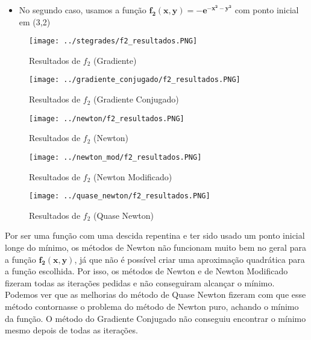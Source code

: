\begin{itemize}
	\item No segundo caso, usamos a função $ \mathbf{f_2(x,y) = -e^{-x^2 -y^2}} $ com ponto inicial em (3,2)
\end{itemize}

\begin{figure}[H]
	\centering
	\begin{minipage}{.5\textwidth}
		\centering
		\texttt{[image: ../stegrades/f2\_resultados.PNG]}
		\caption{Resultados de $ f_2 $ (Gradiente)}
		\label{fig:resultados_grad_f2}
	\end{minipage}%
	\begin{minipage}{.5\textwidth}
		\centering
		\texttt{[image: ../gradiente\_conjugado/f2\_resultados.PNG]}
		\caption{Resultados de $ f_2 $ (Gradiente Conjugado)}
		\label{fig:resultados_grad_conj_f2}
	\end{minipage}
\end{figure}

\begin{figure}[H]
	\centering
	\begin{minipage}{.5\textwidth}
		\centering
		\texttt{[image: ../newton/f2\_resultados.PNG]}
		\caption{Resultados de $ f_2 $ (Newton)}
		\label{fig:resultados_newton_f2}
	\end{minipage}%
	\begin{minipage}{.5\textwidth}
		\centering
		\texttt{[image: ../newton\_mod/f2\_resultados.PNG]}
		\caption{Resultados de $ f_2 $ (Newton Modificado)}
		\label{fig:resultados_newton_mod_f2}
	\end{minipage}
\end{figure}

\begin{figure}[H]
	\begin{center}
		\texttt{[image: ../quase\_newton/f2\_resultados.PNG]}   
		\caption{Resultados de $ f_2 $ (Quase Newton)}
		\label{fig:resultados_quase_newton_f2}
	\end{center}
\end{figure}

Por ser uma função com uma descida repentina e ter sido usado um ponto inicial longe do mínimo, os métodos de Newton não funcionam muito bem no geral para a função $ \mathbf{f_2(x,y)} $, já que não é possível criar uma aproximação quadrática para a função escolhida. Por isso, os métodos de Newton e de Newton Modificado fizeram todas as iterações pedidas e não conseguiram alcançar o mínimo. Podemos ver que as melhorias do método de Quase Newton fizeram com que esse método contornasse o problema do método de Newton puro, achando o mínimo da função. O método do Gradiente Conjugado não conseguiu encontrar o mínimo mesmo depois de todas as iterações.


